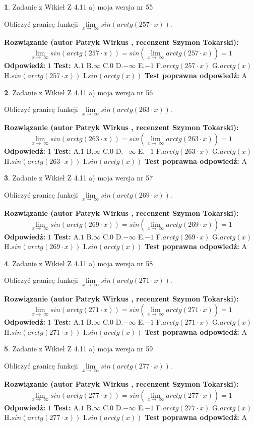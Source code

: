 \documentclass[12pt, a4paper]{article}
\theoremstyle{definition} %
\newtheorem{zad}{}
\newcommand{\zadStart}[1]{\begin{zad}#1\newline}
\newcommand{\zadStop}{\end{zad}}
\newcommand{\rozwStart}[2]{\noindent \textbf{Rozwiązanie (autor #1 , recenzent #2): }\newline}
\newcommand{\rozwStop}{\newline}
\newcommand{\odpStart}{\noindent \textbf{Odpowiedź:}\newline}
\newcommand{\odpStop}{\newline}
\newcommand{\testStart}{\noindent \textbf{Test:}\newline}
\newcommand{\testStop}{\newline}
\newcommand{\kluczStart}{\noindent \textbf{Test poprawna odpowiedź:}\newline}
\newcommand{\kluczStop}{\newline}
\begin{document}
\zadStart{Zadanie z Wikieł Z 4.11 a) moja wersja nr 55}

Obliczyć granicę funkcji  $\lim\limits_{x\to\ \infty}sin(arctg(257\cdot x))$.
\zadStop
\rozwStart{Patryk Wirkus}{Szymon Tokarski}
$$\lim\limits_{x\to\ \infty}sin(arctg(257\cdot x)) = sin(\lim\limits_{x\to\ \infty}arctg(257\cdot x)) = 1$$
\rozwStop
\odpStart
$1$
\odpStop
\testStart
A.$1$ B.$\infty$ C.$0$ D.$-\infty$ E.$-1$
F.$arctg(257\cdot x)$ G.$arctg(x)$
H.$sin(arctg(257\cdot x))$
I.$sin(arctg(x))$
\testStop
\kluczStart
A
\kluczStop



\zadStart{Zadanie z Wikieł Z 4.11 a) moja wersja nr 56}

Obliczyć granicę funkcji  $\lim\limits_{x\to\ \infty}sin(arctg(263\cdot x))$.
\zadStop
\rozwStart{Patryk Wirkus}{Szymon Tokarski}
$$\lim\limits_{x\to\ \infty}sin(arctg(263\cdot x)) = sin(\lim\limits_{x\to\ \infty}arctg(263\cdot x)) = 1$$
\rozwStop
\odpStart
$1$
\odpStop
\testStart
A.$1$ B.$\infty$ C.$0$ D.$-\infty$ E.$-1$
F.$arctg(263\cdot x)$ G.$arctg(x)$
H.$sin(arctg(263\cdot x))$
I.$sin(arctg(x))$
\testStop
\kluczStart
A
\kluczStop



\zadStart{Zadanie z Wikieł Z 4.11 a) moja wersja nr 57}

Obliczyć granicę funkcji  $\lim\limits_{x\to\ \infty}sin(arctg(269\cdot x))$.
\zadStop
\rozwStart{Patryk Wirkus}{Szymon Tokarski}
$$\lim\limits_{x\to\ \infty}sin(arctg(269\cdot x)) = sin(\lim\limits_{x\to\ \infty}arctg(269\cdot x)) = 1$$
\rozwStop
\odpStart
$1$
\odpStop
\testStart
A.$1$ B.$\infty$ C.$0$ D.$-\infty$ E.$-1$
F.$arctg(269\cdot x)$ G.$arctg(x)$
H.$sin(arctg(269\cdot x))$
I.$sin(arctg(x))$
\testStop
\kluczStart
A
\kluczStop



\zadStart{Zadanie z Wikieł Z 4.11 a) moja wersja nr 58}

Obliczyć granicę funkcji  $\lim\limits_{x\to\ \infty}sin(arctg(271\cdot x))$.
\zadStop
\rozwStart{Patryk Wirkus}{Szymon Tokarski}
$$\lim\limits_{x\to\ \infty}sin(arctg(271\cdot x)) = sin(\lim\limits_{x\to\ \infty}arctg(271\cdot x)) = 1$$
\rozwStop
\odpStart
$1$
\odpStop
\testStart
A.$1$ B.$\infty$ C.$0$ D.$-\infty$ E.$-1$
F.$arctg(271\cdot x)$ G.$arctg(x)$
H.$sin(arctg(271\cdot x))$
I.$sin(arctg(x))$
\testStop
\kluczStart
A
\kluczStop



\zadStart{Zadanie z Wikieł Z 4.11 a) moja wersja nr 59}

Obliczyć granicę funkcji  $\lim\limits_{x\to\ \infty}sin(arctg(277\cdot x))$.
\zadStop
\rozwStart{Patryk Wirkus}{Szymon Tokarski}
$$\lim\limits_{x\to\ \infty}sin(arctg(277\cdot x)) = sin(\lim\limits_{x\to\ \infty}arctg(277\cdot x)) = 1$$
\rozwStop
\odpStart
$1$
\odpStop
\testStart
A.$1$ B.$\infty$ C.$0$ D.$-\infty$ E.$-1$
F.$arctg(277\cdot x)$ G.$arctg(x)$
H.$sin(arctg(277\cdot x))$
I.$sin(arctg(x))$
\testStop
\kluczStart
A
\kluczStop
\end{document}
